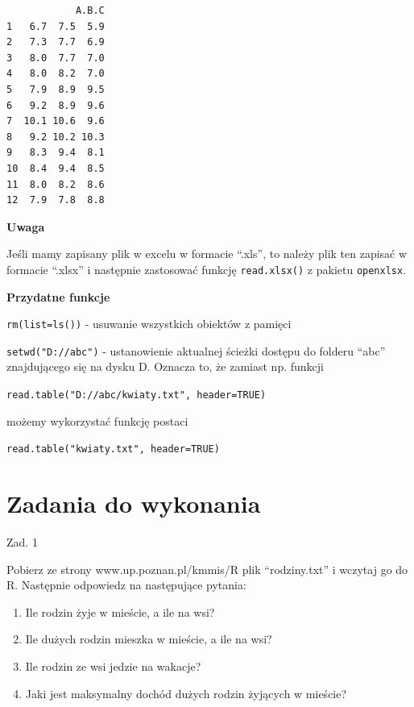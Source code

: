 \documentclass[12pt,B5paper,]{book}
\begin{document}
\begin{verbatim}
            A.B.C
1   6.7  7.5  5.9
2   7.3  7.7  6.9
3   8.0  7.7  7.0
4   8.0  8.2  7.0
5   7.9  8.9  9.5
6   9.2  8.9  9.6
7  10.1 10.6  9.6
8   9.2 10.2 10.3
9   8.3  9.4  8.1
10  8.4  9.4  8.5
11  8.0  8.2  8.6
12  7.9  7.8  8.8
\end{verbatim}

\textbf{Uwaga}

Jeśli mamy zapisany plik w excelu w formacie ``.xls'', to należy plik
ten zapisać w formacie ``.xlsx'' i następnie zastosować funkcję
\texttt{read.xlsx()} z pakietu \texttt{openxlsx}.

\vspace{0.8cm} \textbf{Przydatne funkcje}

\texttt{rm(list=ls())} - usuwanie wszystkich obiektów z pamięci

\texttt{setwd("D://abc")} - ustanowienie aktualnej ścieżki dostępu do
folderu ``abc'' znajdującego się na dysku D. Oznacza to, że zamiast np.
funkcji

\begin{center}
\texttt{read.table("D://abc/kwiaty.txt", header=TRUE)}
\end{center}

możemy wykorzystać funkcję postaci

\begin{center}
\texttt{read.table("kwiaty.txt", header=TRUE)}
\end{center}

\vspace{0.8cm}

\section{Zadania do wykonania}\label{zadania-do-wykonania-2}

Zad. 1

Pobierz ze strony www.up.poznan.pl/kmmis/R plik ``rodziny.txt'' i
wczytaj go do R. Następnie odpowiedz na następujące pytania:

\begin{enumerate}
\def\labelenumi{\alph{enumi})}
\item
  Ile rodzin żyje w mieście, a ile na wsi?
\item
  Ile dużych rodzin mieszka w mieście, a ile na wsi?
\item
  Ile rodzin ze wsi jedzie na wakacje?
\item
  Jaki jest maksymalny dochód dużych rodzin żyjących w mieście?
\end{enumerate}
\end{document}
